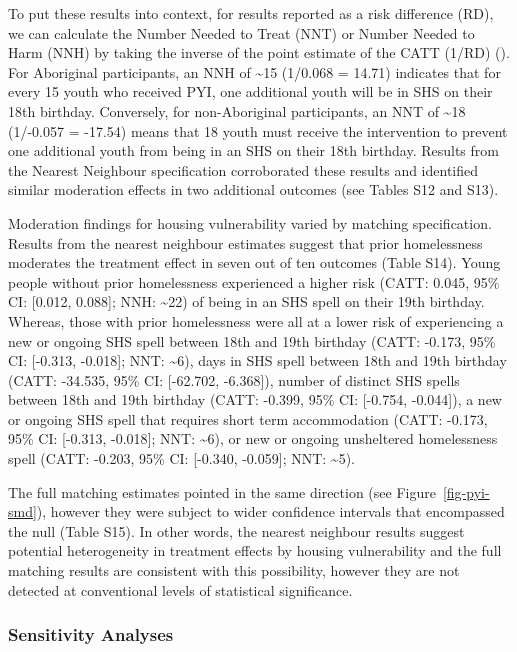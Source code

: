 \documentclass[
  jou,
  floatsintext,
  longtable,
  nolmodern,
  notxfonts,
  notimes,
  colorlinks=true,linkcolor=blue,citecolor=blue,urlcolor=blue]{apa7}
\begin{document}
To put these results into context, for results reported as a risk
difference (RD), we can calculate the Number Needed to Treat (NNT) or
Number Needed to Harm (NNH) by taking the inverse of the point estimate
of the CATT (1/RD)
(). For Aboriginal participants, an NNH of
\textasciitilde15 (1/0.068 = 14.71) indicates that for every 15 youth
who received PYI, one additional youth will be in SHS on their 18th
birthday. Conversely, for non-Aboriginal participants, an NNT of
\textasciitilde18 (1/-0.057 = -17.54) means that 18 youth must receive
the intervention to prevent one additional youth from being in an SHS on
their 18th birthday. Results from the Nearest Neighbour specification
corroborated these results and identified similar moderation effects in
two additional outcomes (see Tables S12 and S13).

Moderation findings for housing vulnerability varied by matching
specification. Results from the nearest neighbour estimates suggest that
prior homelessness moderates the treatment effect in seven out of ten
outcomes (Table S14). Young people without prior homelessness
experienced a higher risk (CATT: 0.045, 95\% CI: {[}0.012, 0.088{]};
NNH: \textasciitilde22) of being in an SHS spell on their 19th birthday.
Whereas, those with prior homelessness were all at a lower risk of
experiencing a new or ongoing SHS spell between 18th and 19th birthday
(CATT: -0.173, 95\% CI: {[}-0.313, -0.018{]}; NNT: \textasciitilde6),
days in SHS spell between 18th and 19th birthday (CATT: -34.535, 95\%
CI: {[}-62.702, -6.368{]}), number of distinct SHS spells between 18th
and 19th birthday (CATT: -0.399, 95\% CI: {[}-0.754, -0.044{]}), a new
or ongoing SHS spell that requires short term accommodation (CATT:
-0.173, 95\% CI: {[}-0.313, -0.018{]}; NNT: \textasciitilde6), or new or
ongoing unsheltered homelessness spell (CATT: -0.203, 95\% CI:
{[}-0.340, -0.059{]}; NNT: \textasciitilde5).

The full matching estimates pointed in the same direction (see
Figure~\ref{fig-pyi-smd}), however they were subject to wider confidence
intervals that encompassed the null (Table S15). In other words, the
nearest neighbour results suggest potential heterogeneity in treatment
effects by housing vulnerability and the full matching results are
consistent with this possibility, however they are not detected at
conventional levels of statistical significance.

\subsubsection{Sensitivity Analyses}\label{sensitivity-analyses}
\end{document}
